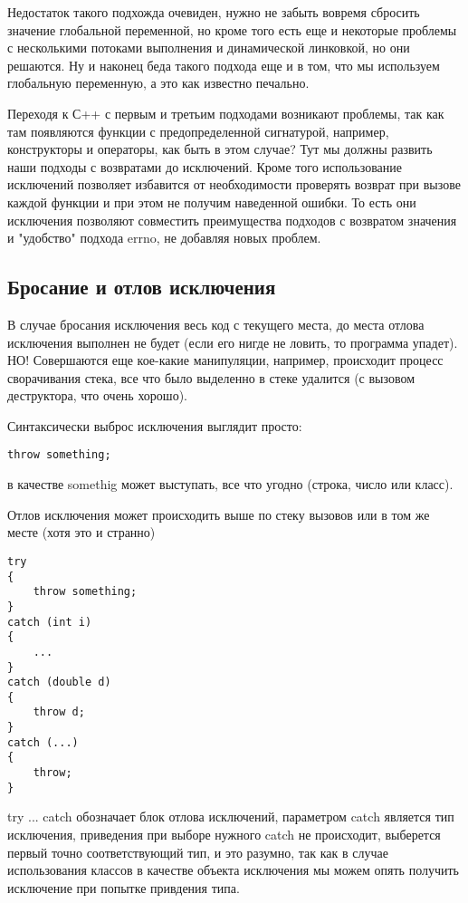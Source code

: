 Недостаток такого подхожда очевиден, нужно не забыть вовремя сбросить значение глобальной переменной, но кроме того есть еще
и некоторые проблемы с несколькими потоками выполнения и динамической линковкой, но они решаются. Ну и наконец беда такого подхода еще и
в том, что мы используем глобальную переменную, а это как известно печально.

Переходя к С++ с первым и третьим подходами возникают проблемы, так как там появляются функции с предопределенной сигнатурой, например,
конструкторы и операторы, как быть в этом случае? Тут мы должны развить наши подходы с возвратами до исключений. Кроме того использование
исключений позволяет избавится от необходимости проверять возврат при вызове каждой функции и при этом не получим наведенной ошибки. То есть
они исключения позволяют совместить преимущества подходов с возвратом значения и "удобство" подхода errno, не добавляя новых проблем.

\subsection{Бросание и отлов исключения}

В случае бросания исключения весь код с текущего места, до места отлова исключения выполнен не будет (если его нигде не ловить, то
программа упадет). НО! Совершаются еще кое-какие манипуляции, например, происходит процесс сворачивания стека, все что было выделенно
в стеке удалится (с вызовом деструктора, что очень хорошо).

Синтаксически выброс исключения выглядит просто:
\begin{lstlisting}
throw something;
\end{lstlisting}

в качестве somethig может выступать, все что угодно (строка, число или класс).

Отлов исключения может происходить выше по стеку вызовов или в том же месте (хотя это и странно)
\begin{lstlisting}
try
{
	throw something;
}
catch (int i)
{
	...
}
catch (double d)
{
	throw d;
}
catch (...)
{
	throw;
}
\end{lstlisting}

try ... catch обозначает блок отлова исключений, параметром catch является тип исключения, приведения при выборе нужного catch не происходит,
выберется первый точно соответствующий тип, и это разумно, так как в случае использования классов в качестве объекта исключения мы можем опять
получить исключение при попытке привдения типа.

